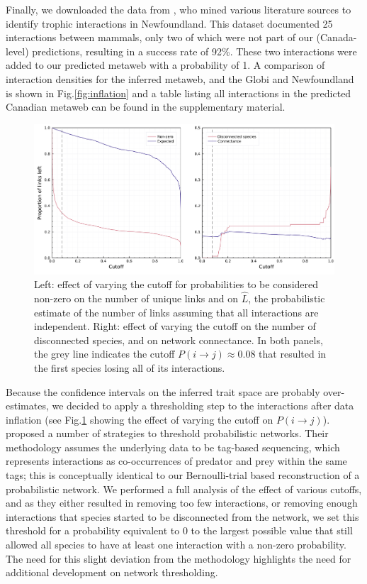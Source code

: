 \begin{refsection}
Finally, we downloaded the data from \cite{Strong2014Impact}, who mined
various literature sources to identify trophic interactions in
Newfoundland. This dataset documented 25 interactions between mammals,
only two of which were not part of our (Canada-level) predictions,
resulting in a success rate of 92\%. These two interactions were added
to our predicted metaweb with a probability of 1. A comparison of
interaction densities for the inferred metaweb, and the Globi and
Newfoundland is shown in Fig.\ref{fig:inflation} and a table listing all
interactions in the predicted Canadian metaweb can be found in the
supplementary material.

\begin{figure}[h]
    \centering
    \includegraphics[width=\textwidth]{figures/figure-cutoffs.png}
    \caption{Left: effect of varying the cutoff for probabilities to be
considered non-zero on the number of unique links and on \(\hat{L}\),
the probabilistic estimate of the number of links assuming that all
interactions are independent. Right: effect of varying the cutoff on the
number of disconnected species, and on network connectance. In both
panels, the grey line indicates the cutoff
\(P(i\rightarrow j) \approx 0.08\) that resulted in the first species
losing all of its interactions.}
    \label{fig:thresholds}
\end{figure}

Because the confidence intervals on the inferred trait space are
probably over-estimates, we decided to apply a thresholding step to the
interactions after data inflation (see Fig.\ref{fig:thresholds} showing the
effect of varying the cutoff on \(P(i \rightarrow j)\)).
\cite{Cirtwill2021Building} proposed a number of strategies to threshold
probabilistic networks. Their methodology assumes the underlying data to
be tag-based sequencing, which represents interactions as co-occurrences
of predator and prey within the same tags; this is conceptually
identical to our Bernoulli-trial based reconstruction of a probabilistic
network. We performed a full analysis of the effect of various cutoffs,
and as they either resulted in removing too few interactions, or
removing enough interactions that species started to be disconnected
from the network, we set this threshold for a probability equivalent to
0 to the largest possible value that still allowed all species to have
at least one interaction with a non-zero probability. The need for this
slight deviation from the \cite{Cirtwill2021Building} methodology highlights the need for additional development on network thresholding.


\end{refsection}
